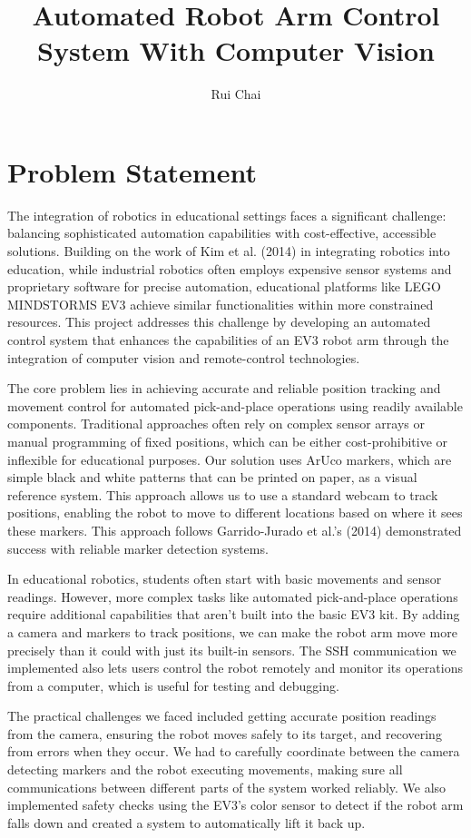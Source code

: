 \documentclass[10pt,twocolumn]{article}
\title{Automated Robot Arm Control System With Computer Vision}
\author{Rui Chai}
\affiliation{Occidental College}
\begin{document}
\maketitle

\section{Problem Statement}
The integration of robotics in educational settings faces a significant challenge: balancing sophisticated automation capabilities with cost-effective, accessible solutions. Building on the work of Kim et al. (2014) \cite{kim2014using} in integrating robotics into education, while industrial robotics often employs expensive sensor systems and proprietary software for precise automation, educational platforms like LEGO MINDSTORMS EV3 achieve similar functionalities within more constrained resources. This project addresses this challenge by developing an automated control system that enhances the capabilities of an EV3 robot arm through the integration of computer vision and remote-control technologies.

The core problem lies in achieving accurate and reliable position tracking and movement control for automated pick-and-place operations using readily available components. Traditional approaches often rely on complex sensor arrays or manual programming of fixed positions, which can be either cost-prohibitive or inflexible for educational purposes. Our solution uses ArUco markers, which are simple black and white patterns that can be printed on paper, as a visual reference system. This approach allows us to use a standard webcam to track positions, enabling the robot to move to different locations based on where it sees these markers. This approach follows Garrido-Jurado et al.'s (2014) \cite{garrido2014automatic} demonstrated success with reliable marker detection systems.

In educational robotics, students often start with basic movements and sensor readings. However, more complex tasks like automated pick-and-place operations require additional capabilities that aren't built into the basic EV3 kit. By adding a camera and markers to track positions, we can make the robot arm move more precisely than it could with just its built-in sensors. The SSH communication we implemented also lets users control the robot remotely and monitor its operations from a computer, which is useful for testing and debugging.

The practical challenges we faced included getting accurate position readings from the camera, ensuring the robot moves safely to its target, and recovering from errors when they occur. We had to carefully coordinate between the camera detecting markers and the robot executing movements, making sure all communications between different parts of the system worked reliably. We also implemented safety checks using the EV3's color sensor to detect if the robot arm falls down and created a system to automatically lift it back up.
\end{document}
